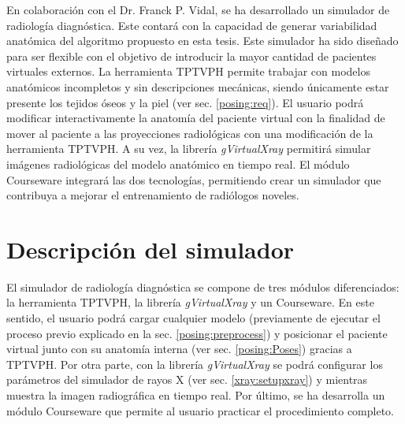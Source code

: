 
En colaboración con el Dr. Franck P. Vidal, se ha desarrollado un simulador de radiología diagnóstica.  %
Este contará con la capacidad de generar variabilidad anatómica del algoritmo propuesto en esta tesis. Este simulador ha sido diseñado para ser flexible con el objetivo de introducir la mayor cantidad de pacientes virtuales externos. La herramienta \ac{TPTVPH} permite trabajar con modelos anatómicos incompletos y sin descripciones mecánicas, siendo únicamente estar presente los tejidos óseos y la piel (ver sec. \ref{posing:req}). El usuario podrá modificar interactivamente la anatomía del paciente virtual con la finalidad de mover al paciente a las proyecciones radiológicas con una modificación de la herramienta \ac{TPTVPH}. A su vez, la librería \emph{gVirtualXray}\cite{sujar:hal}  permitirá simular imágenes radiológicas del modelo anatómico en tiempo real. El módulo \ac{Courseware} integrará las dos tecnologías, permitiendo crear un simulador que contribuya a mejorar el entrenamiento de radiólogos noveles.



\section{Descripción del simulador} 
\label{xray:method}


El simulador de radiología diagnóstica se compone de tres módulos diferenciados: la herramienta \ac{TPTVPH}, la librería \emph{gVirtualXray} y un \ac{Courseware}.
En este sentido, el usuario podrá cargar cualquier modelo (previamente de ejecutar el proceso previo explicado en la sec. \ref{posing:preprocess}) y  posicionar el paciente virtual junto con su anatomía interna (ver sec. \ref{posing:Poses}) gracias a \ac{TPTVPH}. Por otra parte, con la librería \emph{gVirtualXray} se podrá configurar los parámetros del simulador de rayos X (ver sec. \ref{xray:setupxray}) y mientras muestra la imagen radiográfica en tiempo real. Por último, se ha desarrolla un módulo \ac{Courseware} que permite al usuario practicar el procedimiento completo.


